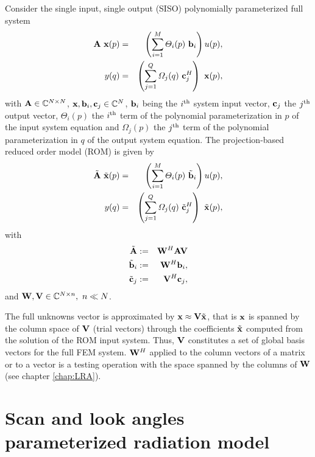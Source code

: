 \begin{mydef}
Consider the single input, single output (SISO) polynomially parameterized full system
\begin{eqnarray}
\label{eq:fullSISO}
\mat{A} \ \vect{x} (p)  & = & \left ( \sum_{i=1}^{M} \Theta_i(p) \ \vect{b}_i \right ) u(p),\nonumber \\
y(q) &= & \left ( \sum_{j=1}^{Q} \Omega_j(q) \ \vect{c}^H_j \right ) \ \vect{x} (p),
\end{eqnarray} with $\mathbf{A} \in \mathbb{C}^{N \times N}$, $\vect{x}, \vect{b}_i, \vect{c}_j \in \mathbb{C}^{N}$, $\vect{b}_i$ being the $i^{\mathrm{th}}$ system input vector, $\vect{c}_j$ the $j^{\mathrm{th}}$ output vector, $\Theta_i(p)$ the $i^{\mathrm{th}}$ term of the polynomial parameterization in $p$ of the input system equation and $\Omega_j(p)$ the $j^{\mathrm{th}}$ term of the polynomial parameterization in $q$ of the output system equation. The projection-based reduced order model (ROM) is given by \cite{FarleMORFE}
\begin{eqnarray}
\label{eq:ROMSISO}
\tilde{\mat{A}} \ \tilde{\vect{x}} (p) & = & \left ( \sum_{i=1}^{M} \Theta_i(p) \ \tilde{\vect{b}}_i \right )  u(p),\nonumber \\
y(q) &= & \left ( \sum_{j=1}^{Q} \Omega_j(q) \ \tilde{\vect{c}}^H_j \right ) \ \tilde{\vect{x}} (p),
\end{eqnarray} with
\begin{eqnarray}
\label{eq:ProjectedSISO}
\tilde{\mat{A}} & := & \mat{W}^H \mat{A} \mat{V} \nonumber \\
\tilde{\vect{b}}_i & := & \mat{W}^H \vect{b}_i,\nonumber \\
\tilde{\vect{c}}_j & := & \mat{V}^H \vect{c}_j,
\end{eqnarray} and $\mathbf{W}, \mathbf{V} \in \mathbb{C}^{N \times n}, \ n \ll N$.
\end{mydef}
The full unknowns vector is approximated by $\vect{x} \approx \mat{V} \tilde{\vect{x}}$, that is $\vect{x}$ is spanned by the column space of $\mathbf{V}$ (trial vectors) through the coefficients $\tilde{\vect{x}}$ computed from the solution of the ROM input system. Thus, $\mathbf{V}$ constitutes a set of global basis vectors for the full FEM system. $\mathbf{W}^H$ applied to the column vectors of a matrix or to a vector is a testing operation with the space spanned by the columns of $\mathbf{W}$ (see chapter \ref{chap:LRA}).

\section{Scan and look angles parameterized radiation model}

